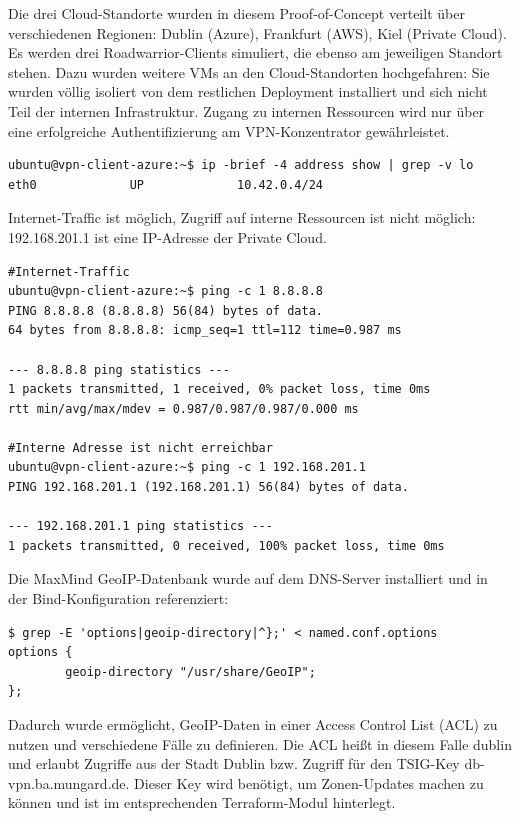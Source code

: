 Die drei Cloud-Standorte wurden in diesem Proof-of-Concept verteilt über verschiedenen Regionen: Dublin (Azure), Frankfurt (AWS), Kiel (Private Cloud). Es werden drei Roadwarrior-Clients simuliert, die ebenso am jeweiligen Standort stehen. Dazu wurden weitere VMs an den Cloud-Standorten hochgefahren: Sie wurden völlig isoliert von dem restlichen Deployment installiert und sich nicht Teil der internen Infrastruktur. Zugang zu internen Ressourcen wird nur über eine erfolgreiche Authentifizierung am VPN-Konzentrator gewährleistet.

\begin{lstlisting}[label=ext-ip-addr-roadwarrior,caption=Der simulierte Roadwarrior-Client ist nicht Teil der Netzwerke 10.32.0.0/16 bzw. 10.33.0.0/16]
ubuntu@vpn-client-azure:~$ ip -brief -4 address show | grep -v lo
eth0             UP             10.42.0.4/24
\end{lstlisting}

Internet-Traffic ist möglich, Zugriff auf interne Ressourcen ist nicht möglich: 192.168.201.1 ist eine IP-Adresse der Private Cloud.

\begin{lstlisting}[label=internet-access-roadwarrior,caption=Der Roadwarrior-Client kann auf das Internet zugreifen, jedoch nicht auf interne Ressourcen ohne VPN-Einwahl]
#Internet-Traffic
ubuntu@vpn-client-azure:~$ ping -c 1 8.8.8.8
PING 8.8.8.8 (8.8.8.8) 56(84) bytes of data.
64 bytes from 8.8.8.8: icmp_seq=1 ttl=112 time=0.987 ms

--- 8.8.8.8 ping statistics ---
1 packets transmitted, 1 received, 0% packet loss, time 0ms
rtt min/avg/max/mdev = 0.987/0.987/0.987/0.000 ms

#Interne Adresse ist nicht erreichbar 
ubuntu@vpn-client-azure:~$ ping -c 1 192.168.201.1
PING 192.168.201.1 (192.168.201.1) 56(84) bytes of data.

--- 192.168.201.1 ping statistics ---
1 packets transmitted, 0 received, 100% packet loss, time 0ms
\end{lstlisting}

Die MaxMind GeoIP-Datenbank wurde auf dem DNS-Server installiert und in der Bind-Konfiguration referenziert:

\begin{lstlisting}[label=bind-geoip-directory,caption=.]
$ grep -E 'options|geoip-directory|^};' < named.conf.options
options {
        geoip-directory "/usr/share/GeoIP";
};
\end{lstlisting}

Dadurch wurde ermöglicht, GeoIP-Daten in einer Access Control List (ACL) zu nutzen und verschiedene Fälle zu definieren. Die ACL heißt in diesem Falle \glqq dublin\grqq{} und erlaubt Zugriffe aus der Stadt Dublin bzw. Zugriff für den TSIG-Key db-vpn.ba.mungard.de. Dieser Key wird benötigt, um Zonen-Updates machen zu können und ist im entsprechenden Terraform-Modul hinterlegt.

